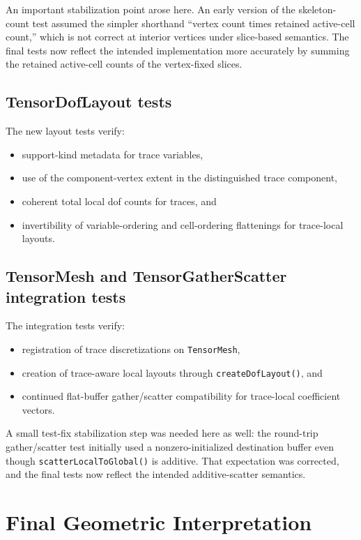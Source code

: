 \documentclass[11pt]{article}
\begin{document}
An important stabilization point arose here. An early version of the skeleton-count test assumed the simpler shorthand ``vertex count times retained active-cell count,'' which is not correct at interior vertices under slice-based semantics. The final tests now reflect the intended implementation more accurately by summing the retained active-cell counts of the vertex-fixed slices.

\subsection{TensorDofLayout tests}

The new layout tests verify:
\begin{itemize}[leftmargin=2em]
  \item support-kind metadata for trace variables,
  \item use of the component-vertex extent in the distinguished trace component,
  \item coherent total local dof counts for traces, and
  \item invertibility of variable-ordering and cell-ordering flattenings for trace-local layouts.
\end{itemize}

\subsection{TensorMesh and TensorGatherScatter integration tests}

The integration tests verify:
\begin{itemize}[leftmargin=2em]
  \item registration of trace discretizations on \texttt{TensorMesh},
  \item creation of trace-aware local layouts through \texttt{createDofLayout()}, and
  \item continued flat-buffer gather/scatter compatibility for trace-local coefficient vectors.
\end{itemize}

A small test-fix stabilization step was needed here as well: the round-trip gather/scatter test initially used a nonzero-initialized destination buffer even though \texttt{scatterLocalToGlobal()} is additive. That expectation was corrected, and the final tests now reflect the intended additive-scatter semantics.

\section{Final Geometric Interpretation}
\end{document}
